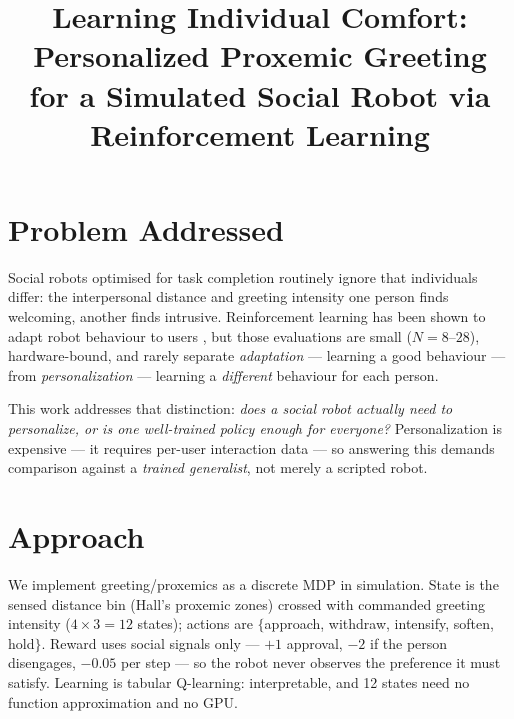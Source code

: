 \documentclass[conference,a4paper]{IEEEtran}
\begin{document}
\title{Learning Individual Comfort: Personalized Proxemic Greeting\\
for a Simulated Social Robot via Reinforcement Learning}

\author{
}

\maketitle

\section{Problem Addressed}

Social robots optimised for task completion routinely ignore that individuals
differ: the interpersonal distance and greeting intensity one person finds
welcoming, another finds intrusive. Reinforcement learning has been shown to adapt
robot behaviour to users \cite{wang2025,tozadore2018,gonzalez2024,zedda2023}, but
those evaluations are small ($N{=}8$--$28$), hardware-bound, and rarely separate
\emph{adaptation} --- learning a good behaviour --- from \emph{personalization}
--- learning a \emph{different} behaviour for each person.

This work addresses that distinction: \emph{does a social robot actually need to
personalize, or is one well-trained policy enough for everyone?} Personalization is
expensive --- it requires per-user interaction data --- so answering this demands
comparison against a \emph{trained generalist}, not merely a scripted robot.

\section{Approach}

We implement greeting/proxemics as a discrete MDP in simulation. State is the
sensed distance bin (Hall's proxemic zones) crossed with commanded greeting
intensity ($4\times3=12$ states); actions are $\{$approach, withdraw, intensify,
soften, hold$\}$. Reward uses social signals only --- $+1$ approval, $-2$ if the
person disengages, $-0.05$ per step --- so the robot never observes the preference
it must satisfy. Learning is tabular Q-learning: interpretable, and 12 states need
no function approximation and no GPU.
\end{document}
